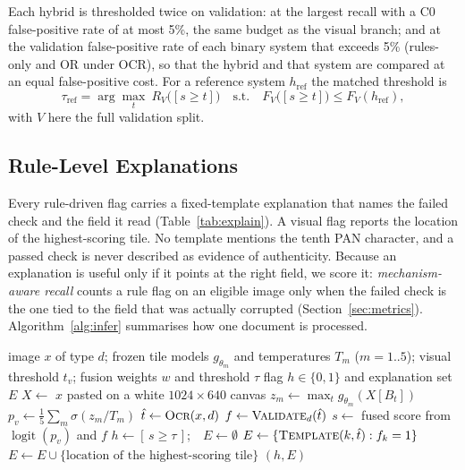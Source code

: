\documentclass[conference]{IEEEtran}
\begin{document}
Each hybrid is thresholded twice on validation: at the largest recall
with a C0 false-positive rate of at most 5\%, the same budget as the
visual branch; and at the validation false-positive rate of each
binary system that exceeds 5\% (rules-only and OR under OCR), so that
the hybrid and that system are compared at an equal false-positive
cost. For a reference system $h_{\mathrm{ref}}$ the matched threshold is
\begin{equation}
\label{eq:matched}
\tau_{\mathrm{ref}}=\arg\max_{t}\ R_{V}\big([s\ge t]\big)
\quad\text{s.t.}\quad F_{V}\big([s\ge t]\big)\le F_{V}(h_{\mathrm{ref}}),
\end{equation}
with $V$ here the full validation split.

\subsection{Rule-Level Explanations}
\label{subsec:explanations}

Every rule-driven flag carries a fixed-template explanation that names
the failed check and the field it read (Table~\ref{tab:explain}). A
visual flag reports the location of the highest-scoring tile. No
template mentions the tenth PAN character, and a passed check is never
described as evidence of authenticity. Because an explanation is useful
only if it points at the right field, we score it:
\emph{mechanism-aware recall} counts a rule flag on an eligible image
only when the failed check is the one tied to the field that was
actually corrupted (Section~\ref{sec:metrics}).
Algorithm~\ref{alg:infer} summarises how one document is processed.

\begin{algorithm}[!t]
\caption{Verification of one document image}
\label{alg:infer}
\begin{algorithmic}[1]
\Require image $x$ of type $d$; frozen tile models $g_{\theta_m}$ and
  temperatures $T_m$ ($m=1..5$); visual threshold $t_v$; fusion weights
  $w$ and threshold $\tau$
\Ensure flag $h\in\{0,1\}$ and explanation set $E$
\State $X\gets$ $x$ pasted on a white $1024{\times}640$ canvas
  \State $z_m\gets\max_t g_{\theta_m}(X[B_t])$ \Comment{(\ref{eq:maxtile})}
\EndFor
\State $p_v\gets\frac{1}{5}\sum_m\sigma(z_m/T_m)$ \Comment{(\ref{eq:calib})}
\State $\hat t\gets\textsc{Ocr}(x,d)$ 
\State $f\gets\textsc{Validate}_d(\hat t)$ 
\State $s\gets$ fused score from $\operatorname{logit}(p_v)$ and $f$ 
\State $h\gets[\,s\ge\tau\,]$;\ \ $E\gets\emptyset$
  \State $E\gets\{\textsc{Template}(k,\hat t): f_k=1\}$ 
    \State $E\gets E\cup\{\text{location of the highest-scoring tile}\}$
  \EndIf
\EndIf
\State \Return $(h,E)$
\end{algorithmic}
\end{algorithm}
\end{document}
